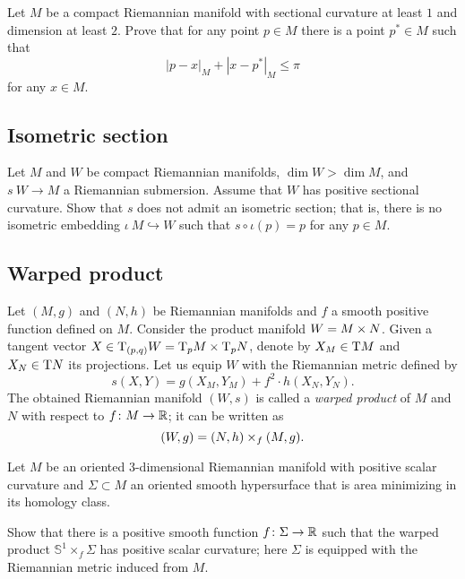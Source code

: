 \begin{pr}
Let $M$ be a compact Riemannian manifold with sectional curvature at least $1$ 
and dimension at least $2$. 
Prove that for any point $p\in M$ there is a point $p^*\in M$ such that 
\[|p-x|_M+|x-p^*|_M\le \pi\]
for any $x\in M$.
\end{pr}

\subsection*{Isometric section\hard}
\label{Isometric section}

\begin{pr}
Let $M$ and $W$ be compact Riemannian manifolds,
$\dim W>\dim M$,
and $s\:W\to M$ a Riemannian submersion.
Assume that $W$ has positive sectional curvature.
Show that $s$ does not admit an isometric section;
that is, there is no isometric embedding $\iota\:M\hookrightarrow W$ such that $s\circ\iota(p)=p$ for any $p\in M$.
\end{pr}

\subsection*{Warped product}
\label{Warped product}
\label{page:warped product}

Let $(M,g)$ and $(N,h)$ be Riemannian manifolds 
and $f$ a smooth positive function defined on $M$.
Consider the product manifold $W\z=M\times N$.
Given a tangent vector 
$X\z\in \T_{(p,q)} W
\z=\T_p M\times \T_p N$, denote by 
$X_M\z\in \T M$ and $X_N\z\in \T N$ its projections.
Let us equip $W$ with the Riemannian metric defined by
\[s(X,Y)=g(X_M,Y_M)+f^2\cdot h(X_N,Y_N).\]
The obtained Riemannian manifold $(W,s)$ is called a \emph{warped product} of $M$ and $N$ with respect to $f\colon M\to \mathbb{R}$;
it can be written as  
\[(W,g)\z=(N,h)\times_f(M,g).\]

\begin{pr}
Let $M$ be an oriented 3-dimensional Riemannian manifold with positive scalar curvature 
and $\Sigma\subset M$ an oriented smooth hypersurface that is area minimizing in its homology class.

Show that there is a positive smooth function $f\colon\Sigma\to \mathbb{R}$
such that the warped product $\mathbb S^1\times_f \Sigma$
has positive scalar curvature;
here $\Sigma$ is equipped with the Riemannian metric
induced from $M$.
\end{pr}

